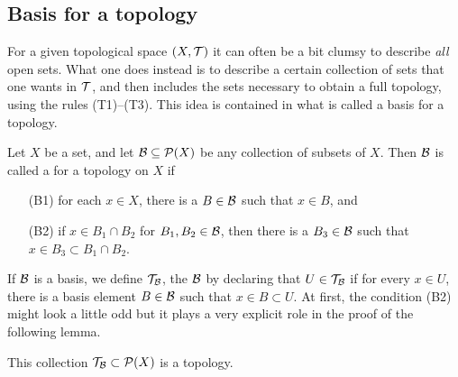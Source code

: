\subsection{Basis for a topology}
For a given topological space $(X,\mathcal{T})$ it can often be a bit clumsy to describe \emph{all} open sets. What one does instead is to describe a certain collection of sets that one wants in $\mathcal{T}$, and then includes the sets necessary to obtain a full topology, using the rules (T1)--(T3). This idea is contained in what is called a basis for a topology.
\begin{defn}
  Let $X$ be a set, and let $\mathcal{B} \subseteq \mathcal{P}(X)$ be any collection of subsets of $X$. Then $\mathcal{B}$ is called a  for a topology on $X$ if
  \begin{enumerate}
    \item[(B1)] for each $x \in X$, there is a $B \in \mathcal{B}$ such that $x \in B$, and
    \item[(B2)] if $x \in B_1 \cap B_2$ for $B_1, B_2 \in \mathcal{B}$, then there is a $B_3 \in \mathcal{B}$ such that $x \in B_3 \subset B_1 \cap B_2$.
  \end{enumerate}
\end{defn}
If $\mathcal{B}$ is a basis, we define $\mathcal{T}_{\mathcal{B}}$, the  $\mathcal{B}$ by declaring that $U \in \mathcal{T}_{\mathcal{B}}$ if for every $x \in U$, there is a basis element $B \in \mathcal{B}$ such that $x \in B \subset U$. At first, the condition (B2) might look a little odd but it plays a very explicit role in the proof of the following lemma.
\begin{lem}
  This collection $\mathcal{T}_{\mathcal{B}} \subset \mathcal{P}(X)$ is a topology.
\end{lem}
